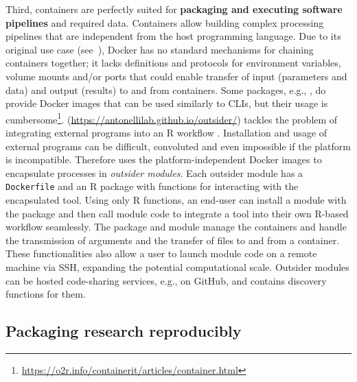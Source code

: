 \label{pipelines} Third, containers are perfectly suited for
\textbf{packaging and executing software pipelines} and required data.
Containers allow building complex processing pipelines that are
independent from the host programming language. Due to its original use
case (see~), Docker has no standard mechanisms for
chaining containers together; it lacks definitions and protocols for
environment variables, volume mounts and/or ports that could enable
transfer of input (parameters and data) and output (results) to and from
containers. Some packages, e.g., , do provide Docker
images that can be used similarly to CLIs, but their usage is
cumbersome\footnote{\href{https://o2r.info/containerit/articles/container.html}{https://o2r.info/containerit/articles/container.html}}.
\textbf{} (\url{https://antonellilab.github.io/outsider/})
tackles the problem of integrating external programs into an R workflow
\citep{bennett_outsider_2020}. Installation and usage of external
programs can be difficult, convoluted and even impossible if the
platform is incompatible. Therefore  uses the
platform-independent Docker images to encapsulate processes in
\emph{outsider modules}. Each outsider module has a \texttt{Dockerfile}
and an R package with functions for interacting with the encapsulated
tool. Using only R functions, an end-user can install a module with the
 package and then call module code to integrate a tool
into their own R-based workflow seamlessly. The  package
and module manage the containers and handle the transmission of
arguments and the transfer of files to and from a container. These
functionalities also allow a user to launch module code on a remote
machine via SSH, expanding the potential computational scale. Outsider
modules can be hosted code-sharing services, e.g., on GitHub, and
 contains discovery functions for them.

\hypertarget{packaging-research-reproducibly}{%
\subsection{Packaging research
reproducibly}\label{packaging-research-reproducibly}}

\label{compendia}

